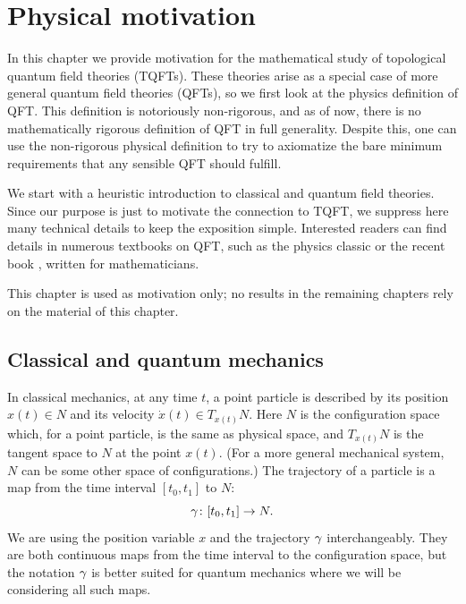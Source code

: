\chapter{Physical motivation}\label{c:physical-motivation}
In this chapter we provide motivation for the mathematical study of topological
quantum field theories (TQFTs). These theories arise as a special case of more
general quantum field theories (QFTs), so we first look at the physics
definition of QFT. This definition is notoriously non-rigorous, and as of now,
there is no mathematically rigorous definition of QFT in full generality.
Despite this, one can use the non-rigorous physical definition to try to
axiomatize the bare minimum requirements that any sensible QFT should fulfill.

We start with a heuristic introduction to classical and quantum field theories.
Since our purpose is just to motivate the connection to TQFT, we suppress here
many technical details to keep the exposition simple. Interested readers can
find details in numerous textbooks on QFT, such as the physics classic
\cite{peskin-schroeder} or the recent book \cite{etingof-qft},
written for mathematicians.

This chapter is used as motivation only; no results in the remaining
chapters rely on the material of this chapter.


\section{Classical and quantum mechanics}\label{s:mechanics}

In classical mechanics, at any time $t$, a point particle is described by its
position $x(t) \in N$ and its velocity $\dot x(t) \in T_{x(t)}N$. Here $N$ is
the configuration space which, for a point particle, is the same as physical
space, and $T_{x(t)}N$ is the tangent space to $N$ at the point $x(t)$.
(For a more general mechanical system, $N$ can be some other space of
configurations.)
The trajectory of a particle is a map from the
time interval $[t_0,t_1]$ to $N$:
\begin{equation}
	\gamma\colon[t_0,t_1] \rightarrow N. \nonumber
\end{equation}
We are using the position variable $x$ and the trajectory $\gamma$
interchangeably. They are both continuous maps from the time interval to the
configuration space, but the notation $\gamma$ is better suited for quantum
mechanics where we will be considering all such maps.

